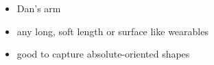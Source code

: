 \begin{itemize}
    \item Dan's arm
    \item any long, soft length or surface like wearables
    \item good to capture absolute-oriented shapes
\end{itemize}